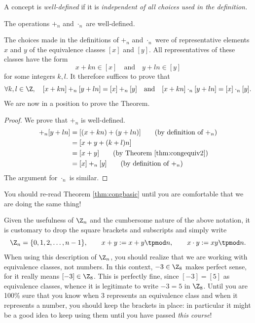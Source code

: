 \begin{defn}\label{defn:well}
A concept is \emph{well-defined} if it is \emph{independent of all choices used in the definition.}
\end{defn}

\begin{thm}\label{thm:congwd}
The operations $+_n$ and $\cdot_n$ are well-defined.
\end{thm}

\noindent The choices made in the definitions of $+_n$ and $\cdot_n$ were of representative elements $x$ and $y$ of the equivalence classes $[x]$ and $[y]$. All representatives of these classes have the form
\[x+kn\in[x]\quad\text{and}\quad y+ln\in[y]\]
for some integers $k,l$. It therefore suffices to prove that
\[\forall k,l\in\Z,\quad [x+kn]+_n[y+ln]=[x]+_n[y]\quad\text{and}\quad [x+kn]\cdot_n[y+ln]=[x]\cdot_n[y].\]
We are now in a position to prove the Theorem.

\begin{proof}
We prove that $+_n$ is well-defined.
\begin{align*}
[x+kn]+_n[y+ln]&=[(x+kn)+(y+ln)]\tag*{(by definition of $+_n$)}\\
&=[x+y+(k+l)n]\\
&=[x+y]\tag*{(by Theorem \ref{thm:congequiv2})}\\
&=[x]+_n[y]\tag*{(by definition of $+_n$)}
\end{align*}
The argument for $\cdot_n$ is similar.
\end{proof}

\noindent You should re-read Theorem \ref{thm:congbasic} until you are comfortable that we are doing the same thing!\\

\begin{aside}

Given the usefulness of $\Z_n$ and the cumbersome nature of the above notation, it is customary to drop the square brackets and subscripts and simply write
\[\Z_n=\{0,1,2,\ldots,n-1\},\qquad x+y:=x+y\tpmod n,\qquad x\cdot y:=xy\tpmod n.\]
When using this description of $\Z_n$, you should realize that we are working with equivalence classes, not numbers. In this context, $-3\in\Z_8$ makes perfect sense, for it really means $[-3]\in\Z_8$. This is perfectly fine, since $[-3]=[5]$ as equivalence classes, whence it is legitimate to write $-3=5$ in $\Z_8$. Until you are 100\% sure that you know when 3 represents an equivalence class and when it represents a number, you should keep the brackets in place: in particular it might be a good idea to keep using them until you have passed \emph{this course}!
\end{aside}


